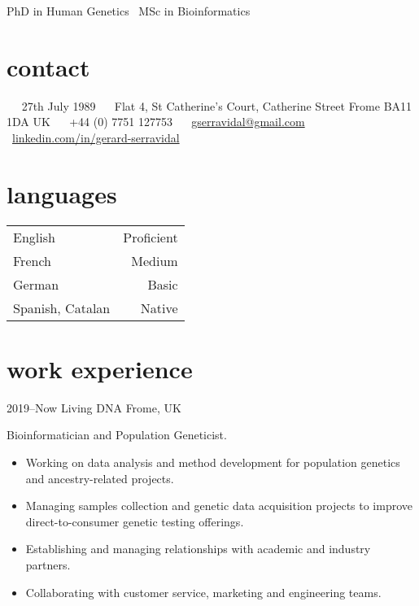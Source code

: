 \documentclass[]{friggeri-cv}
\begin{document}
       {PhD in Human Genetics \textbullet\ MSc in Bioinformatics}


\begin{aside}
  \section{contact}
    ~
    \faCalendar\ 
    27th July 1989
  	~
  	\faHome\
  	Flat 4, St Catherine's Court, Catherine Street
  	Frome BA11 1DA
  	UK
    ~
    \faPhone\
    +44 (0) 7751 127753
    ~
    {\small \faEnvelope}\ 
    \href{mailto:gserravidal@gmail.com}{gserravidal@gmail.com}
    ~
    \faLinkedinSquare\ \href{www.linkedin.com/in/gerard-serravidal}{linkedin.com/in/gerard-serravidal}
    ~
  \section{languages}
  	\begin{tabular}{lr}
  	English & Proficient \\
	French & Medium \\
	German & Basic \\
	Spanish, Catalan & Native 
	\end{tabular}
\end{aside}


\section{work experience}
\begin{entrylist}
	\entry
		{2019--Now}
		{Living DNA}
		{Frome, UK}
		{Bioinformatician and Population Geneticist. 
		\begin{itemize}
		\item Working on data analysis and method development for population genetics and ancestry-related projects.
		\item Managing samples collection and genetic data acquisition projects to improve direct-to-consumer genetic testing offerings.
		\item Establishing and managing relationships with academic and industry partners.
		\item Collaborating with customer service, marketing and engineering teams.
	\end{itemize}				
		}
\end{entrylist}
			
\end{document}
